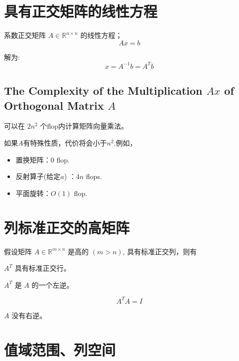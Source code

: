 \section{具有正交矩阵的线性方程}

系数正交矩阵 $ A \in \mathbb{R}^{n \times n} $ 的线性方程；
\begin{equation}
A x=b
\end{equation}

解为:
\begin{equation}
x=A^{-1} b=A^{T} b
\end{equation}


\subsection{The Complexity of the Multiplication $Ax$ of Orthogonal Matrix $A$}
可以在 $ 2  {n}^{2} $ 个flop内计算矩阵向量乘法。 

如果$A$有特殊性质，代价将会小于$n^2$.例如，

\begin{itemize}
    \item 置换矩阵：$0$ flop.
    \item 反射算子(给定$a$) ：$4n$ flops.
    \item 平面旋转：$O(1)$ flop.
\end{itemize}

\section{列标准正交的高矩阵}

\begin{theorem}
    假设矩阵 $ A \in \mathbb{R}^{m \times n} $ 是高的 $ ({m}>{n}) $, 具有标准正交列，则有

    $ A^{T} $ 具有标准正交行。
\end{theorem}

\begin{theorem}
    $ A^{T} $ 是 $ A $ 的一个左逆。

    \begin{equation}A^T A =I\end{equation}
\end{theorem}

\begin{theorem}
    $ A $ 没有右逆。
\end{theorem}

\section{值域范围、列空间}

